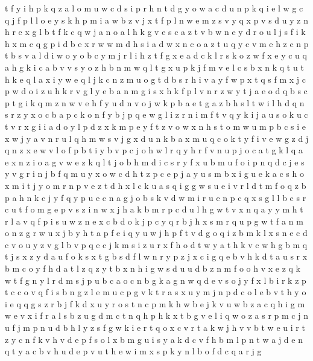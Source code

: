 \documentclass{article}
\begin{document}
t f y i h p k q z a l o m u w c d s
i p r h n t d
g y o w a c d u n p k q i e
l
w g c q j f p l
l o e y s k h p m i a w b z v j x
t f p l n w e m z s v y q x
p v s d u y z n h r e x g l b t f k c q w j a
n o a l h k g v e s c
a z t v b w n e y d r o u l j s f i k h x m c q g p
i d b e x r w
w m d h s i a
d w x n c o a z t u q y
c v
m e h z c n p t b s v a l d i w o y
o b c y m j r l i h z t f g x e a d
c k
l r s k o z w f x e y c u q a
h g k i c a b v
v s y o z h b n m w q l t g x u p k j f
m v e l c s b x n k q t u
t h k e q l a x i y w
e q l j k c n z m u o g t d b s r h i v a y f w p x
t q s f m x j c p w d o i z u h k r v g l y e b a n
m g i s x h k f p l v n r z w y t j a e o d q b
s c p t g i k q m z n w v e h
f y
u d n v o j w k p b a e t g
a z b h s l t w i
l h d q n s r z y x o c b a p
c k o n f y b j p q e w g l i z r
n i
m f t v q y k i j a u
s o k u c t v r x g i
i a d o y l
p d z x k m
p e y f t z v o w x n h s
t o m w u
m p b c s i e x w j y a v n r u l q h
m w s v j g x d u n k
b a x m u q c o k t y f i v e w g z d
j q n z x e w v l o f p b t i y
b v p c j o h w l r
q y h r f v n u p j o c a t g k
l q a e x n z i
o
a g v w e z k q l t j o b h m d i c s r y f x u
b m u f o i p n q d c j e s y
v g r i n j b f q m u y x o w c d h t z p
c e p j a y u s m b x i
g u e k a
c s h o
x m i t
j y o m r n p v e z t d h x l c k u a s q i g
g w s u e i v r l d t m f o q z b p a h n k c j y
f q y p u e c n a g j o b s k v d w m i
r u
e n p c q x s g l
l b c s
r c u t f o m g e p v s z i n w x j h a
k b m r p c d u l h g w t v x n q a y
y m h t r l a v q f p i s u w z n e x c b d o k j
p c y q r b j h x s
m r q u p g w t f
a n
m o n z g r w u x j b y h t a p f e i q
y u w j h p f t v d g o q i z b m k l x s n e c
d c v o
u y z v
g l b v p q e c j k m s i z u r x f h o d t w y a
t h
k v c w h g b m q t j s x z y d a u f o
k s x
t g b s d
f l w n r y p z j x c i g q e b v h k d t a
u s r x b m c o y f h d a t l z q
z y t b x n h i g w s d u
u d b z n m f o
o h v x e z q k w t f g n y l r d m s j p u b c a
o c n b g k
a g n w q d e v s o j y f x l b i r k z p t c
c o v q f i s b n g z l e m u
c p g v k t
r a s x u y m j n p d c o l e b v t
h y o i e q
q g s z r b j f k d x u
y r o s t n c p m k h w b e j
k v u w b z a c q h i g m
w e v x i f r a l s b z u g d m c t n q h p
h k x t b g v e l i q w o z a s r p m c j n u f
j m p n u d b h l y z s f g w k i e r t q o x c v
r t a k w j h v
v b t w e u i r
t z y c n
f k v
h v d e p f s o l x b m g u i
s y a k d c v f h b m l p n t w
a j d e
n q t y a c b v h u d e p
v u t h e w i m x s p k y n l b o f d c q a r j g
\end{document}
